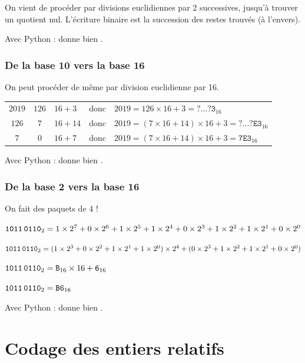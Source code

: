 On vient de procéder par divisions euclidiennes par 2 successives, jusqu'à trouver un quotient nul. L'écriture binaire est la succession des restes trouvés (à l'envers).

Avec Python :  donne bien .

\medskip

\subsubsection{De la base 10 vers la base 16} On peut procéder de même par division euclidienne par 16.

\begin{tabular}{c@{\,$=$\,}c@{\,$\times$\,}lll}
$2019$ & $126$ & $16 + 3$ & donc & $2019=126\times16 + 3  = \texttt{?...?3}_{16}$\\

$126$ & $7$ & $16 + 14$ & donc & $2019=(7\times16+14)\times16 + 3  = \texttt{?...?E3}_{16}$\\

$7$ & $0$ & $16 + 7$ & donc & $2019=(7\times16+14)\times16 + 3  = \texttt{7E3}_{16}$\\
\end{tabular}

Avec Python :  donne bien .

\subsubsection{De la base 2 vers la base 16} On fait des paquets de 4 !

$\texttt{1011\,0110}_2
=1\times2^7+0\times2^6+1\times2^5+1\times2^4+0\times2^3+1\times2^2+1\times2^1+0\times2^0$

$\texttt{1011\,0110}_2
=(1\times2^3+0\times2^2+1\times2^1+1\times2^0)\times2^4+(0\times2^3+1\times2^2+1\times2^1+0\times2^0)$


$\texttt{1011\,0110}_2=\texttt{B}_{16}\times 16 +\texttt{6}_{16}$

$\texttt{1011\,0110}_2=\texttt{B6}_{16}$

Avec Python :  donne bien .

\section{Codage des entiers relatifs}


